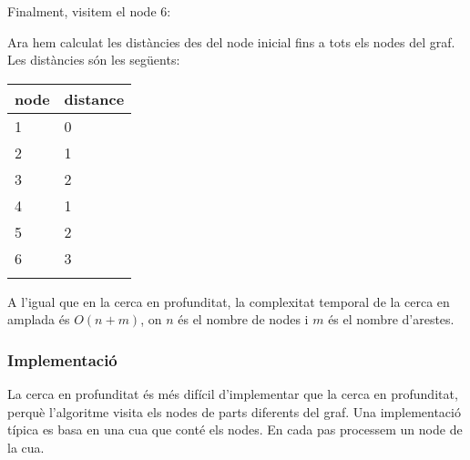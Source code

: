 Finalment, visitem el node 6:
\begin{center}
\end{center}
Ara hem calculat les distàncies des del node inicial fins a tots els
nodes del graf. Les distàncies són les següents:


\begin{tabular}{ll}
\\
node & distance \\
\hline
1 & 0 \\
2 & 1 \\
3 & 2 \\
4 & 1 \\
5 & 2 \\
6 & 3 \\
\\
\end{tabular}


A l'igual que en la cerca en profunditat, la complexitat temporal de
la cerca en amplada és $O(n+m)$, on $n$ és el nombre de nodes i $m$ és
el nombre d'arestes.

\subsubsection*{Implementació}

La cerca en profunditat és més difícil d'implementar que la cerca en
profunditat, perquè l'algoritme visita els nodes de parts diferents
del graf. Una implementació típica es basa en una cua que conté els
nodes. En cada pas processem un node de la cua.

